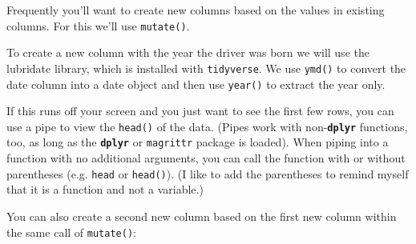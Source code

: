 \documentclass[]{book}
\newenvironment{Shaded}{\begin{snugshade}}{\end{snugshade}}
\newcommand{\KeywordTok}[1]{\textcolor[rgb]{0.13,0.29,0.53}{\textbf{#1}}}
\newcommand{\DataTypeTok}[1]{\textcolor[rgb]{0.13,0.29,0.53}{#1}}
\newcommand{\DecValTok}[1]{\textcolor[rgb]{0.00,0.00,0.81}{#1}}
\newcommand{\StringTok}[1]{\textcolor[rgb]{0.31,0.60,0.02}{#1}}
\newcommand{\OperatorTok}[1]{\textcolor[rgb]{0.81,0.36,0.00}{\textbf{#1}}}
\newcommand{\NormalTok}[1]{#1}
\theoremstyle{definition}
\theoremstyle{definition}
\theoremstyle{definition}
\theoremstyle{remark}
\begin{document}
Frequently you'll want to create new columns based on the values in
existing columns. For this we'll use \texttt{mutate()}.

To create a new column with the year the driver was born we will use the
lubridate library, which is installed with \texttt{tidyverse}. We use
\texttt{ymd()} to convert the date column into a date object and then
use \texttt{year()} to extract the year only.

\begin{Shaded}
\end{Shaded}

If this runs off your screen and you just want to see the first few
rows, you can use a pipe to view the \texttt{head()} of the data. (Pipes
work with non-\textbf{\texttt{dplyr}} functions, too, as long as the
\textbf{\texttt{dplyr}} or \texttt{magrittr} package is loaded). When
piping into a function with no additional arguments, you can call the
function with or without parentheses (e.g. \texttt{head} or
\texttt{head()}). (I like to add the parentheses to remind myself that
it is a function and not a variable.)

\begin{Shaded}
\end{Shaded}

You can also create a second new column based on the first new column
within the same call of \texttt{mutate()}:

\begin{Shaded}
\end{Shaded}
\end{document}
